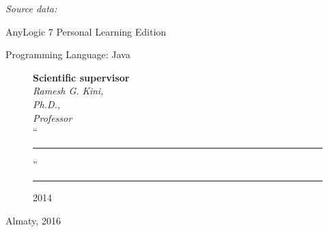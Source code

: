 \begin{titlepage}
    \emph{Source data:}

    \begin{compactitem}
    \item AnyLogic 7 Personal Learning Edition
    \item Programming Language: Java
    \end{compactitem}


    \begin{figure}[ht]
            \begin{minipage}[t]{0.6\linewidth}
                {\bf Scientific supervisor}\\

                {\em Ramesh G. Kini,\\
                Ph.D.,\\
                Professor}\\

                ``\rule{2em}{0.4pt}'' \rule{8em}{0.4pt} 2014\\
         \end{minipage}
    \end{figure}

    \begin{center}
        \vfill
        Almaty, 2016
    \end{center}

    \end{titlepage}
